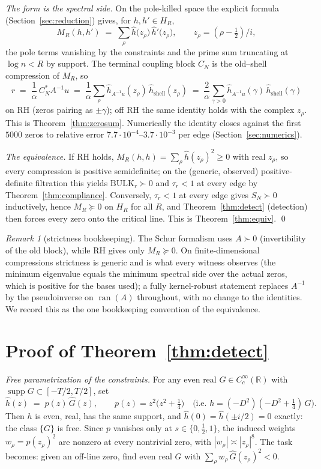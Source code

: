 \documentclass[11pt,reqno]{amsart}
\theoremstyle{plain}
\theoremstyle{definition}
\theoremstyle{remark}
\newtheorem{remark}[theorem]{Remark}
\newcommand{\R}{\mathbb{R}}
\newcommand{\supp}{\operatorname{supp}}
\begin{document}
\emph{The form is the spectral side.} On the pole-killed space the explicit formula
(Section~\ref{sec:reduction}) gives, for $h, h' \in H_R$,
\[
M_R(h, h') \;=\; \sum_\rho \hat h\big(z_\rho\big)\, \hat h'\big(z_\rho\big),
\qquad z_\rho = (\rho - \tfrac12)/i ,
\]
the pole terms vanishing by the constraints and the prime sum truncating at $\log n < R$ by
support. The terminal coupling block $C_N$ is the old--shell compression of $M_R$, so
\[
r \;=\; \frac{1}{\alpha}\, C_N^* A^{-1} u
\;=\; \frac{1}{\alpha} \sum_\rho \hat h_{A^{-1}u}(z_\rho)\, \hat h_{\mathrm{shell}}(z_\rho)
\;=\; \frac{2}{\alpha} \sum_{\gamma > 0} \hat h_{A^{-1}u}(\gamma)\,
\hat h_{\mathrm{shell}}(\gamma)
\]
on RH (zeros pairing as $\pm\gamma$); off RH the same identity holds with the complex
$z_\rho$. This is Theorem~\ref{thm:zerosum}. Numerically the identity closes against the
first $5000$ zeros to relative error $7.7\cdot 10^{-4}$--$3.7\cdot 10^{-3}$ per edge
(Section~\ref{sec:numerics}).

\emph{The equivalence.} If RH holds, $M_R(h,h) = \sum_\rho \hat h(z_\rho)^2 \ge 0$ with real
$z_\rho$, so every compression is positive semidefinite; on the (generic, observed)
positive-definite filtration this yields $\mathrm{BULK}_r \succ 0$ and $\tau_r < 1$ at every
edge by Theorem~\ref{thm:compliance}. Conversely, $\tau_r < 1$ at every edge gives
$S_N \succ 0$ inductively, hence $M_R \succeq 0$ on $H_R$ for all $R$, and
Theorem~\ref{thm:detect} (detection) then forces every zero onto the critical line. This is
Theorem~\ref{thm:equiv}. \qed

\begin{remark}[strictness bookkeeping]
The Schur formalism uses $A \succ 0$ (invertibility of the old block), while RH gives only
$M_R \succeq 0$. On finite-dimensional compressions strictness is generic and is what every
witness observes (the minimum eigenvalue equals the minimum spectral side over the actual
zeros, which is positive for the bases used); a fully kernel-robust statement replaces
$A^{-1}$ by the pseudoinverse on $\operatorname{ran}(A)$ throughout, with no change to the
identities. We record this as the one bookkeeping convention of the equivalence.
\end{remark}

\section{Proof of Theorem~\ref{thm:detect}}\label{sec:detect}

\emph{Free parametrization of the constraints.} For any even real
$G \in C_c^\infty(\R)$ with $\supp G \subset [-T/2, T/2]$, set
\[
\hat h(z) \;=\; p(z)\, \hat G(z), \qquad p(z) = z^2\big(z^2 + \tfrac14\big)
\quad\big(\text{i.e. } h = (-D^2)(-D^2 + \tfrac14)\, G\big).
\]
Then $h$ is even, real, has the same support, and $\hat h(0) = \hat h(\pm i/2) = 0$ exactly:
the class $\{G\}$ is free. Since $p$ vanishes only at $s \in \{0, \tfrac12, 1\}$, the induced
weights $w_\rho = p(z_\rho)^2$ are nonzero at every nontrivial zero, with
$|w_\rho| \asymp |z_\rho|^8$. The task becomes: given an off-line zero, find even real $G$
with $\sum_\rho w_\rho\, \hat G(z_\rho)^2 < 0$.
\end{document}
